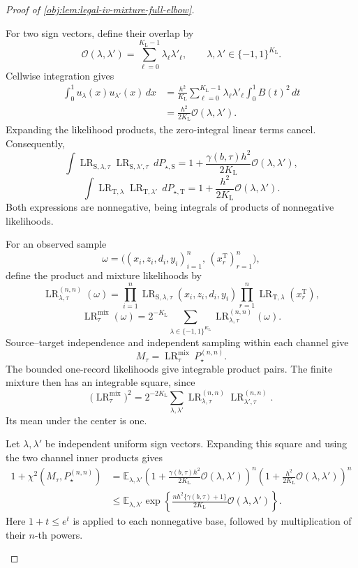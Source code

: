 \begin{proof}[Proof of \cref{obj:lem:legal-iv-mixture-full-elbow}]
\begin{enumerate}
For two sign vectors, define their overlap by
\[
\mathscr O(\lambda,\lambda')
=
\sum_{\ell=0}^{K_{\mathrm L}-1}\lambda_{\ell}\lambda'_{\ell},
\qquad
\lambda,\lambda'\in\{-1,1\}^{K_{\mathrm L}}.
\]
Cellwise integration gives
\[
\begin{aligned}
\int_0^1u_{\lambda}(x)u_{\lambda'}(x)\,dx
&=
\frac{h^2}{K_{\mathrm L}}
\sum_{\ell=0}^{K_{\mathrm L}-1}
\lambda_{\ell}\lambda'_{\ell}\int_0^1B(t)^2\,dt\\
&=\frac{h^2}{2K_{\mathrm L}}\mathscr O(\lambda,\lambda').
\end{aligned}
\]
Expanding the likelihood products, the zero-integral linear terms cancel. Consequently,
\[
\int
\operatorname{LR}_{\mathrm S,\lambda,\tau}
\operatorname{LR}_{\mathrm S,\lambda',\tau}\,dP_{\star,\mathrm S}
=
1+\frac{\gamma(b,\tau)h^2}{2K_{\mathrm L}}
\mathscr O(\lambda,\lambda'),
\]
\[
\int
\operatorname{LR}_{\mathrm T,\lambda}
\operatorname{LR}_{\mathrm T,\lambda'}\,dP_{\star,\mathrm T}
=
1+\frac{h^2}{2K_{\mathrm L}}
\mathscr O(\lambda,\lambda').
\]
Both expressions are nonnegative, being integrals of products of nonnegative likelihoods.

For an observed sample
\[
\omega=
\bigl((x_i,z_i,d_i,y_i)_{i=1}^n,\,
(x_r^{\mathrm T})_{r=1}^n\bigr),
\]
define the product and mixture likelihoods by
\[
\operatorname{LR}_{\lambda,\tau}^{(n,n)}(\omega)
=
\prod_{i=1}^n
\operatorname{LR}_{\mathrm S,\lambda,\tau}(x_i,z_i,d_i,y_i)
\prod_{r=1}^n
\operatorname{LR}_{\mathrm T,\lambda}(x_r^{\mathrm T}),
\]
\[
\operatorname{LR}_{\tau}^{\mathrm{mix}}(\omega)
=
2^{-K_{\mathrm L}}
\sum_{\lambda\in\{-1,1\}^{K_{\mathrm L}}}
\operatorname{LR}_{\lambda,\tau}^{(n,n)}(\omega).
\]
Source--target independence and independent sampling within each channel give
\[
M_{\tau}
=
\operatorname{LR}_{\tau}^{\mathrm{mix}}\,P_{\star}^{(n,n)}.
\]
The bounded one-record likelihoods give integrable product pairs. The finite mixture then has an integrable square, since
\[
\bigl(\operatorname{LR}_{\tau}^{\mathrm{mix}}\bigr)^2
=
2^{-2K_{\mathrm L}}
\sum_{\lambda,\lambda'}
\operatorname{LR}_{\lambda,\tau}^{(n,n)}
\operatorname{LR}_{\lambda',\tau}^{(n,n)}.
\]
Its mean under the center is one.

Let \(\lambda,\lambda'\) be independent uniform sign vectors. Expanding this square and using the two channel inner products gives
\[
\begin{aligned}
1+\chi^2(M_{\tau},P_{\star}^{(n,n)})
&=
\mathbb E_{\lambda,\lambda'}
\left(1+
\frac{\gamma(b,\tau)h^2}{2K_{\mathrm L}}
\mathscr O(\lambda,\lambda')\right)^n
\left(1+
\frac{h^2}{2K_{\mathrm L}}
\mathscr O(\lambda,\lambda')\right)^n\\
&\le
\mathbb E_{\lambda,\lambda'}
\exp\left\{
\frac{nh^2\{\gamma(b,\tau)+1\}}
{2K_{\mathrm L}}\mathscr O(\lambda,\lambda')
\right\}.
\end{aligned}
\]
Here \(1+t\le e^t\) is applied to each nonnegative base, followed by multiplication of their \(n\)-th powers.


\end{enumerate}
\end{proof}
